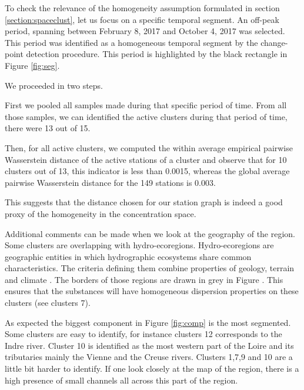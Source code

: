 To check the relevance of the homogeneity assumption formulated in section \ref{section:spaceclust}, let us focus on a specific temporal segment. An off-peak period, spanning between February 8, 2017 and October 4, 2017 was selected. This period was identified as a homogeneous temporal segment by the change-point detection procedure.  This period is highlighted by the black rectangle in Figure \ref{fig:seg}. 

We proceeded in two steps. 

First we pooled all samples made during that specific period of time. From all those samples, we can identified the active clusters during that period of time, there were 13 out of 15. 

Then, for all active clusters, we computed the within average empirical pairwise Wasserstein distance of the active stations of a cluster and observe that for 10 clusters out of 13, this indicator is less than 0.0015, whereas the global average pairwise Wasserstein distance for the 149 stations is 0.003. 

This suggests that the distance chosen for our station graph is indeed a good proxy of the homogeneity in the concentration space. 

Additional comments can be made when we look at the geography of the region. Some clusters are overlapping with hydro-ecoregions. Hydro-ecoregions are geographic entities in which hydrographic ecosystems share common characteristics. The criteria defining them combine properties of geology, terrain and climate \cite{wasson:hal-02580774}. The borders of those regions are drawn in grey in Figure . This ensures that the substances will have homogeneous dispersion properties on these clusters (see clusters 7).

As expected the biggest component in Figure \ref{fig:comp} is the most segmented. Some clusters are easy to identify, for instance clusters 12 corresponds to the Indre river. Cluster 10 is identified as the most western part of the Loire and its tributaries mainly the Vienne and the Creuse rivers. Clusters 1,7,9 and 10 are a little bit harder to identify. If one look closely at the map of the region, there is a high presence of small channels all across this part of the region. 


